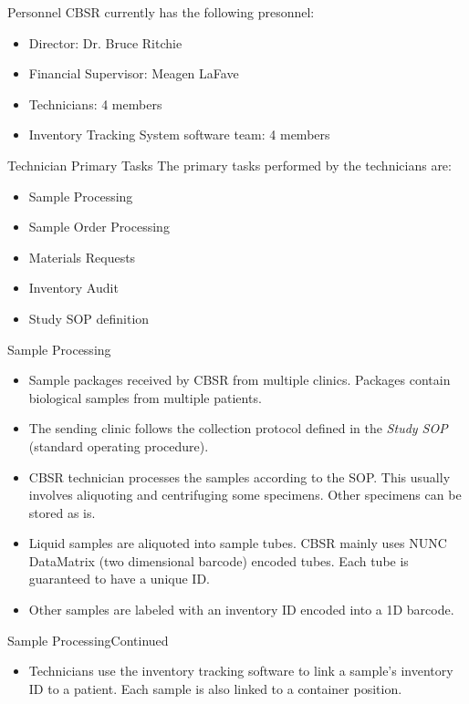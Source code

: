 \documentclass[hyperref={pdfpagelabels=false}]{beamer}
\begin{document}
\begin{frame}{Personnel}
  CBSR currently has the following presonnel:
  \begin{itemize}
    \item Director: Dr. Bruce Ritchie
    \item Financial Supervisor: Meagen LaFave
    \item Technicians: 4 members
    \item Inventory Tracking System software team: 4 members
  \end{itemize}
\end{frame}


\begin{frame}{Technician Primary Tasks}
  The primary tasks performed by the technicians are:
  \begin{itemize}
    \item Sample Processing
    \item Sample Order Processing
    \item Materials Requests
    \item Inventory Audit
    \item Study SOP definition
  \end{itemize}
\end{frame}

\begin{frame}{Sample Processing}{}
  \begin{itemize}
    \item Sample packages received by CBSR from multiple clinics.
      Packages contain biological samples from multiple patients.
    \item The sending clinic follows the collection protocol defined in the
      \emph{Study SOP} (standard operating procedure).
    \item CBSR technician processes the samples according to the SOP. This
      usually involves aliquoting and centrifuging some specimens. Other
      specimens can be stored as is.
    \item Liquid samples are aliquoted into sample tubes. CBSR mainly uses NUNC
      DataMatrix (two dimensional barcode) encoded tubes. Each tube is
      guaranteed to have a unique ID.
    \item Other samples are labeled with an inventory ID encoded into a 1D
      barcode.
  \end{itemize}
\end{frame}

\begin{frame}{Sample Processing}{Continued}
  \begin{itemize}
    \item Technicians use the inventory tracking software to link a sample's
      inventory ID to a patient. Each sample is also linked to a container
      position.
  \end{itemize}
\end{frame}
\end{document}
